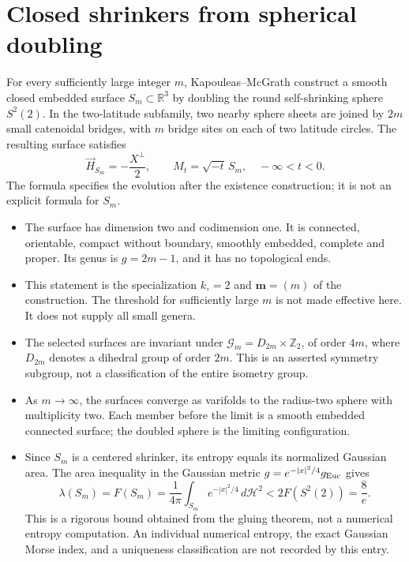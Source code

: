 \chapter{Closed shrinkers from spherical doubling}\label{sec:catalogue-spherical-doubling-shrinkers}
\begin{example}\label{ex:catalogue-spherical-doubling-shrinkers}
For every sufficiently large integer $m$, Kapouleas--McGrath construct a smooth closed embedded surface $S_m\subset\mathbb R^3$ by doubling the round self-shrinking sphere $S^2(2)$. In the two-latitude subfamily, two nearby sphere sheets are joined by $2m$ small catenoidal bridges, with $m$ bridge sites on each of two latitude circles. The resulting surface satisfies
\[
 \vec H_{S_m}=-\frac{X^\perp}{2},\qquad
 M_t=\sqrt{-t}\,S_m,\quad -\infty<t<0.
\]
The formula specifies the evolution after the existence construction; it is not an explicit formula for $S_m$.
\begin{itemize}
\item The surface has dimension two and codimension one. It is connected, orientable, compact without boundary, smoothly embedded, complete and proper. Its genus is $g=2m-1$, and it has no topological ends.
\item This statement is the specialization $k_\circ=2$ and $\mathbf m=(m)$ of the construction. The threshold for sufficiently large $m$ is not made effective here. It does not supply all small genera.
\item The selected surfaces are invariant under $\mathcal G_m=D_{2m}\times\mathbb Z_2$, of order $4m$, where $D_{2m}$ denotes a dihedral group of order $2m$. This is an asserted symmetry subgroup, not a classification of the entire isometry group.
\item As $m\to\infty$, the surfaces converge as varifolds to the radius-two sphere with multiplicity two. Each member before the limit is a smooth embedded connected surface; the doubled sphere is the limiting configuration.
\item Since $S_m$ is a centered shrinker, its entropy equals its normalized Gaussian area. The area inequality in the Gaussian metric $g=e^{-|x|^2/4}g_{\rm Euc}$ gives
\[
 \lambda(S_m)=F(S_m)=\frac1{4\pi}\int_{S_m}e^{-|x|^2/4}\,d\mathcal H^2
 <2F(S^2(2))=\frac8e.
\]
This is a rigorous bound obtained from the gluing theorem, not a numerical entropy computation. An individual numerical entropy, the exact Gaussian Morse index, and a uniqueness classification are not recorded by this entry.

\end{itemize}
\end{example}
